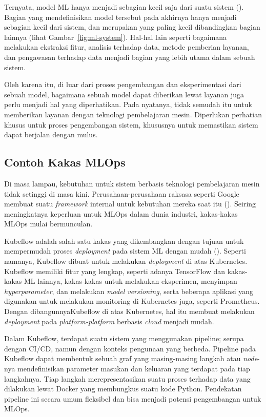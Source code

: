 Ternyata, model ML hanya menjadi sebagian kecil saja dari suatu sistem (\cite{NIPS2015_86df7dcf}).
Bagian yang mendefinisikan model tersebut pada akhirnya hanya menjadi sebagian kecil dari sistem, dan merupakan yang paling kecil dibandingkan bagian lainnya (lihat Gambar~\ref{fig:ml-system}).
Hal-hal lain seperti bagaimana melakukan ekstraksi fitur, analisis terhadap data, metode pemberian layanan, dan pengawasan terhadap data menjadi bagian yang lebih utama dalam sebuah sistem.

Oleh karena itu, di luar dari proses pengembangan dan eksperimentasi dari sebuah model, bagaimana sebuah model dapat diberikan lewat layanan juga perlu menjadi hal yang diperhatikan.
Pada nyatanya, tidak semudah itu untuk memberikan layanan dengan teknologi pembelajaran mesin.
Diperlukan perhatian khusus untuk proses pengembangan sistem, khususnya untuk memastikan sistem dapat berjalan dengan mulus.

\subsection{Contoh Kakas MLOps}

Di masa lampau, kebutuhan untuk sistem berbasis teknologi pembelajaran mesin tidak setinggi di masa kini. 
Perusahaan-perusahaan raksasa seperti Google membuat suatu \textit{framework} internal untuk kebutuhan mereka saat itu (\cite{mlops}).
Seiring meningkatnya keperluan untuk MLOps dalam dunia industri, kakas-kakas MLOps mulai bermunculan.

Kubeflow adalah salah satu kakas yang dikembangkan dengan tujuan untuk mempermudah proses \textit{deployment} pada sistem ML dengan mudah (\cite{k8s}).
Seperti namanya, Kubeflow dibuat untuk melakukan \textit{deployment} di atas Kubernetes.
Kubeflow memiliki fitur yang lengkap, seperti adanya TensorFlow dan kakas-kakas ML lainnya, kakas-kakas untuk melakukan eksperimen, menyimpan \textit{hyperparameter}, dan melakukan \textit{model versioning}, serta beberapa aplikasi yang digunakan untuk melakukan monitoring di Kubernetes juga, seperti Prometheus.
Dengan dibangunnyaKubeflow di atas Kubernetes, hal itu membuat melakukan \textit{deployment} pada \textit{platform-platform} berbasis \textit{cloud} menjadi mudah.

Dalam Kubeflow, terdapat suatu sistem yang menggunakan pipeline; serupa dengan CI/CD, namun dengan konteks pengunaan yang berbeda.
Pipeline pada Kubeflow dapat membentuk sebuah graf yang masing-masing langkah atau \textit{node}-nya mendefinisikan parameter masukan dan keluaran yang terdapat pada tiap langkahnya.
Tiap langkah merepresentasikan suatu proses terhadap data yang dilakukan lewat Docker yang membungkus suatu kode Python.
Pendekatan pipeline ini secara umum fleksibel dan bisa menjadi potensi pengembangan untuk MLOps.

